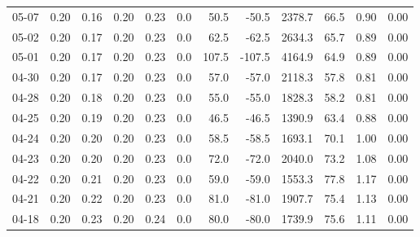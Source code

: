 \begin{threeparttable}
{\begin{tabular}{lrrrrrrrrrrr}
  05-07 &          0.20 &          0.16 &          0.20 &        0.23 &                 0.0 &                50.5 &      -50.5 &              2378.7 &             66.5 &            0.90 &                   0.00 \\
  05-02 &          0.20 &          0.17 &          0.20 &        0.23 &                 0.0 &                62.5 &      -62.5 &              2634.3 &             65.7 &            0.89 &                   0.00 \\
  05-01 &          0.20 &          0.17 &          0.20 &        0.23 &                 0.0 &               107.5 &     -107.5 &              4164.9 &             64.9 &            0.89 &                   0.00 \\
  04-30 &          0.20 &          0.17 &          0.20 &        0.23 &                 0.0 &                57.0 &      -57.0 &              2118.3 &             57.8 &            0.81 &                   0.00 \\
  04-28 &          0.20 &          0.18 &          0.20 &        0.23 &                 0.0 &                55.0 &      -55.0 &              1828.3 &             58.2 &            0.81 &                   0.00 \\
  04-25 &          0.20 &          0.19 &          0.20 &        0.23 &                 0.0 &                46.5 &      -46.5 &              1390.9 &             63.4 &            0.88 &                   0.00 \\
  04-24 &          0.20 &          0.20 &          0.20 &        0.23 &                 0.0 &                58.5 &      -58.5 &              1693.1 &             70.1 &            1.00 &                   0.00 \\
  04-23 &          0.20 &          0.20 &          0.20 &        0.23 &                 0.0 &                72.0 &      -72.0 &              2040.0 &             73.2 &            1.08 &                   0.00 \\
  04-22 &          0.20 &          0.21 &          0.20 &        0.23 &                 0.0 &                59.0 &      -59.0 &              1553.3 &             77.8 &            1.17 &                   0.00 \\
  04-21 &          0.20 &          0.22 &          0.20 &        0.23 &                 0.0 &                81.0 &      -81.0 &              1907.7 &             75.4 &            1.13 &                   0.00 \\
  04-18 &          0.20 &          0.23 &          0.20 &        0.24 &                 0.0 &                80.0 &      -80.0 &              1739.9 &             75.6 &            1.11 &                   0.00 \\

\end{tabular}}
\end{threeparttable}
